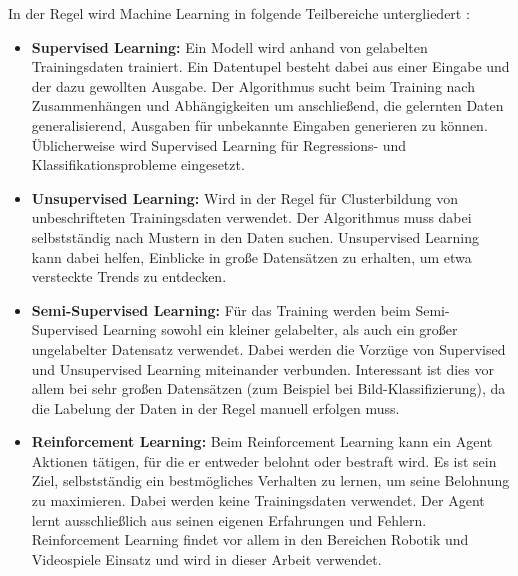 In der Regel wird Machine Learning in folgende Teilbereiche untergliedert \cite{monkeylearnIntroductionMachine}:
\begin{itemize}
    \item \textbf{Supervised Learning:}
    Ein Modell wird anhand von gelabelten Trainingsdaten trainiert.
    Ein Datentupel besteht dabei aus einer Eingabe und der dazu gewollten Ausgabe.
    Der Algorithmus sucht beim Training nach Zusammenhängen und Abhängigkeiten um anschließend, die gelernten Daten generalisierend, Ausgaben für unbekannte Eingaben generieren zu können.
    Üblicherweise wird Supervised Learning für Regressions- und Klassifikationsprobleme eingesetzt.

    \item \textbf{Unsupervised Learning:}
    Wird in der Regel für Clusterbildung von unbeschrifteten Trainingsdaten verwendet.
    Der Algorithmus muss dabei selbstständig nach Mustern in den Daten suchen.
    Unsupervised Learning kann dabei helfen, Einblicke in große Datensätzen zu erhalten, um etwa versteckte Trends zu entdecken.

    \item \textbf{Semi-Supervised Learning:}
    Für das Training werden beim Semi-Supervised Learning sowohl ein kleiner gelabelter, als auch ein großer ungelabelter Datensatz verwendet.
    Dabei werden die Vorzüge von Supervised und Unsupervised Learning miteinander verbunden.
    Interessant ist dies vor allem bei sehr großen Datensätzen (zum Beispiel bei Bild-Klassifizierung), da die Labelung der Daten in der Regel manuell erfolgen muss.

    \item \textbf{Reinforcement Learning:}
    Beim Reinforcement Learning kann ein Agent Aktionen tätigen, für die er entweder belohnt oder bestraft wird.
    Es ist sein Ziel, selbstständig ein bestmögliches Verhalten zu lernen, um seine Belohnung zu maximieren.
    Dabei werden keine Trainingsdaten verwendet.
    Der Agent lernt ausschließlich aus seinen eigenen Erfahrungen und Fehlern.
    Reinforcement Learning findet vor allem in den Bereichen Robotik und Videospiele Einsatz und wird in dieser Arbeit verwendet.
\end{itemize}

    
